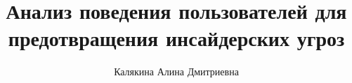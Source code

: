 \title{Анализ поведения пользователей для предотвращения инсайдерских угроз}
\author{Калякина Алина Дмитриевна}

\makeatletter
\renewcommand\@maketitle{
	\begin{titlepage}
		\begin{center}
			\texttt{[image: msu]} \\
		Московский государственный университет имени М.\,В. Ломоносова
			\\
			Факультет вычислительной математики и кибернетики \\
			Кафедра автоматизации систем вычислительных комплексов \\
			
			\vspace{8em}
			
			{\Large \@author} \\[1.5em]
			{\LARGE \textbf{\@title} \par}
			
			\vspace{4.5em}
			
			{\Large \textsc{курсовая работа}}
			
			\vfill
			
			\begin{flushright}
				{\large
					\textbf{Научный руководитель}:\\
					к.\,ф.-м.\,н., ???\\
					Д.\,В.~Царёв\\
					\vspace{0.2em}
				}
			\end{flushright}
			\vfill
			
			Москва, 2020
		\end{center}
	\end{titlepage}
}
\makeatother

\maketitle
\setcounter{page}{2}
